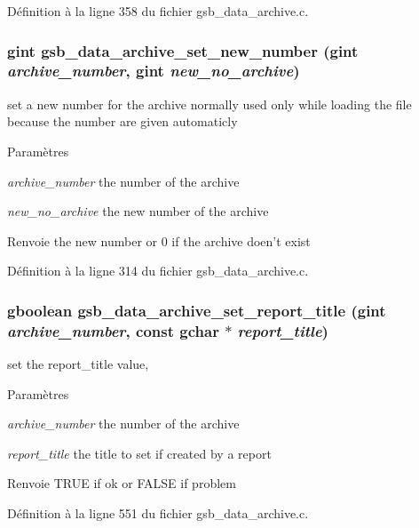 Définition à la ligne 358 du fichier gsb\_\-data\_\-archive.c.

\subsubsection[{gsb\_\-data\_\-archive\_\-set\_\-new\_\-number}]{\setlength{\rightskip}{0pt plus 5cm}gint gsb\_\-data\_\-archive\_\-set\_\-new\_\-number (gint {\em archive\_\-number}, \/  gint {\em new\_\-no\_\-archive})}\label{gsb__data__archive_8h_a85712d057b32e6e854932bc6d9d30b73}
set a new number for the archive normally used only while loading the file because the number are given automaticly


\begin{DoxyParams}{Paramètres}
\item[{\em archive\_\-number}]the number of the archive \item[{\em new\_\-no\_\-archive}]the new number of the archive\end{DoxyParams}
\begin{DoxyReturn}{Renvoie}
the new number or 0 if the archive doen't exist 
\end{DoxyReturn}


Définition à la ligne 314 du fichier gsb\_\-data\_\-archive.c.

\subsubsection[{gsb\_\-data\_\-archive\_\-set\_\-report\_\-title}]{\setlength{\rightskip}{0pt plus 5cm}gboolean gsb\_\-data\_\-archive\_\-set\_\-report\_\-title (gint {\em archive\_\-number}, \/  const gchar $\ast$ {\em report\_\-title})}\label{gsb__data__archive_8h_a29cea4dae2fb32483efd7bc480d07d4d}
set the report\_\-title value,


\begin{DoxyParams}{Paramètres}
\item[{\em archive\_\-number}]the number of the archive \item[{\em report\_\-title}]the title to set if created by a report\end{DoxyParams}
\begin{DoxyReturn}{Renvoie}
TRUE if ok or FALSE if problem 
\end{DoxyReturn}


Définition à la ligne 551 du fichier gsb\_\-data\_\-archive.c.

